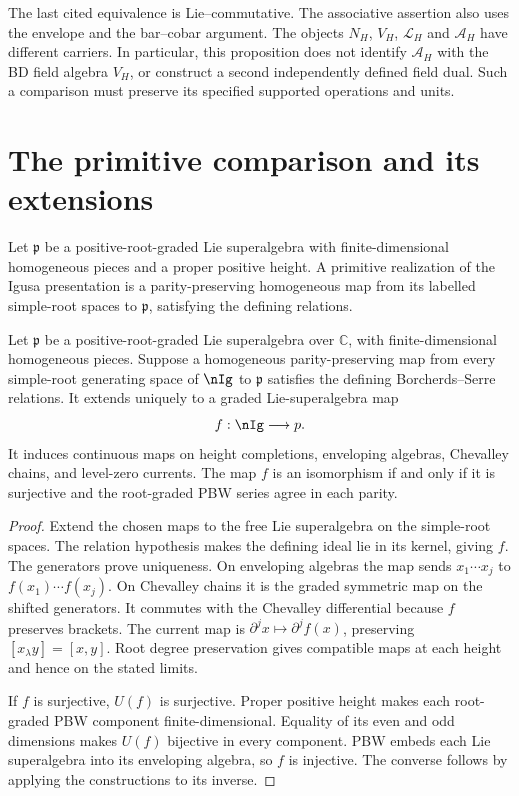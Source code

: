 The last cited equivalence is Lie--commutative. The associative
assertion also uses the envelope and the bar--cobar argument.
The objects \(N_H\), \(V_H\), \(\mathcal L_H\) and
\(\mathcal A_H\) have different carriers. In particular, this
proposition does not identify \(\mathcal A_H\) with the BD
field algebra \(V_H\), or construct a second independently
defined field dual. Such a comparison must preserve its specified
supported operations and units.

\section{The primitive comparison and its extensions}
Let \(\mathfrak p\) be a positive-root-graded Lie superalgebra
with finite-dimensional homogeneous pieces and a proper positive
height. A primitive realization of the Igusa presentation is a
parity-preserving homogeneous map from its labelled simple-root
spaces to \(\mathfrak p\), satisfying the defining relations.

\begin{theorem}
\label{igusa:primitive-presentation-map}
Let \(\mathfrak p\) be a positive-root-graded Lie superalgebra
over \(\mathbb C\), with finite-dimensional homogeneous pieces.
Suppose a homogeneous parity-preserving map from every simple-root
generating space of \(\nIg\) to \(\mathfrak p\) satisfies
the defining Borcherds--Serre relations. It extends uniquely to
a graded Lie-superalgebra map
\[
 f:\nIg\longrightarrow\mathfrak p.
\]
It induces continuous maps on height completions, enveloping
algebras, Chevalley chains, and level-zero currents. The map \(f\)
is an isomorphism if and only if it is surjective and the root-graded
PBW series agree in each parity.
\end{theorem}
\begin{proof}
Extend the chosen maps to the free Lie superalgebra on the
simple-root spaces. The relation hypothesis makes the defining
ideal lie in its kernel, giving \(f\). The generators prove
uniqueness. On enveloping algebras the map sends
\(x_1\cdots x_j\) to \(f(x_1)\cdots f(x_j)\).
On Chevalley chains it is the graded symmetric map on the shifted
generators. It commutes with the Chevalley differential because
\(f\) preserves brackets. The current map is
\(\partial^j x\mapsto\partial^j f(x)\), preserving
\([x_\lambda y]=[x,y]\). Root degree preservation gives
compatible maps at each height and hence on the stated limits.

If \(f\) is surjective, \(U(f)\) is surjective. Proper
positive height makes each root-graded PBW component
finite-dimensional. Equality of its even and odd dimensions makes
\(U(f)\) bijective in every component. PBW embeds each Lie
superalgebra into its enveloping algebra, so \(f\) is injective.
The converse follows by applying the constructions to its inverse.
\end{proof}


